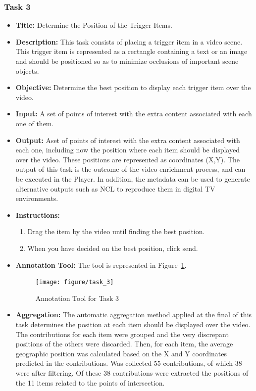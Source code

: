 \subsubsection{Task 3}

\begin{itemize}

\item \textbf{Title:} Determine the Position of the Trigger Items.

\item \textbf{Description:} This task consists of placing a trigger item in a video scene. This trigger item is represented as a rectangle containing a text or an image and should be positioned so as to minimize occlusions of important scene objects.

\item \textbf{Objective:} Determine the best position to display each trigger item over the video.


\item \textbf{Input:} A set of points of interest with the extra content associated with each one of them.

\item \textbf{Output:} Aset of points of interest with the extra content associated with each one, including now the position where each item should be displayed over the video. These positions are represented as coordinates (X,Y). The output of this task is the outcome of the video enrichment process, and can be executed in the Player. In addition, the metadata can be used to generate alternative outputs such as NCL to reproduce them in digital TV environments.


\item \textbf{Instructions:} \begin{enumerate}
	\item Drag the item by the video until finding the best position.
	\item When you have decided on the best position, click send.
\end{enumerate}


\item \textbf{Annotation Tool:} The tool is represented in Figure~\ref{task_3}.
\begin{figure}[h!]
	\centerline{\texttt{[image: figure/task\_3]}}
	\caption{Annotation Tool for Task 3}
	\label{task_3}
\end{figure}

\item \textbf{Aggregation:} The automatic aggregation method applied at the final of this task determines the position at each item should be displayed over the video. The contributions for each item were grouped and the very discrepant positions of the others were discarded. Then, for each item, the average geographic position was calculated based on the X and Y coordinates predicted in the contributions. Was collected 55 contributions, of which 38 were after filtering. Of these 38 contributions were extracted the positions of the 11 items related to the points of intersection.

\end{itemize}


